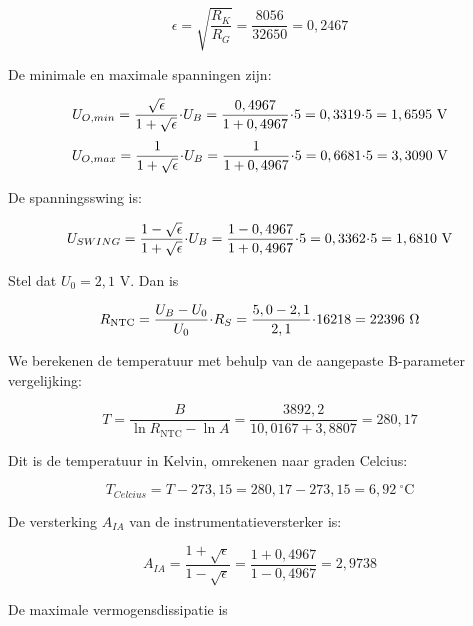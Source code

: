 \documentclass[12pt,a4paper,final,twoside,fleqn]{article}
\newcommand{\rntc}{R_\text{NTC}}
\let\oldcdot\cdot
\renewcommand{\cdot}{\kern-.10em\oldcdot\kern-.10em}
\begin{document}
\begin{equation}
\epsilon = \sqrt{\dfrac{R_K}{R_G}} = \dfrac{8056}{32650} = 0,2467
\end{equation}

De minimale en maximale spanningen zijn:

\begin{equation}
U_{O,min} = \dfrac{\sqrt{\epsilon}}{1+\sqrt{\epsilon}}\cdot U_B
          = \dfrac{0,4967}{1+0,4967}\cdot 5 = 0,3319\cdot 5
          = 1,6595\ \text{V}
\end{equation}
\begin{equation}
U_{O,max} = \dfrac{1}{1+\sqrt{\epsilon}}\cdot U_B
          = \dfrac{1}{1+0,4967}\cdot 5 = 0,6681\cdot 5
          = 3,3090\ \text{V}
\end{equation}

De spanningsswing is:

\begin{equation}
U_{SWING} = \dfrac{1-\sqrt{\epsilon}}{1+\sqrt{\epsilon}}\cdot U_B
          = \dfrac{1-0,4967}{1+0,4967}\cdot 5 = 0,3362\cdot 5
          = 1,6810\ \text{V}
\end{equation}

Stel dat $U_0 = 2,1$ V. Dan is

\begin{equation}
\rntc = \dfrac{U_B-U_0}{U_0}\cdot R_S = \dfrac{5,0-2,1}{2,1}\cdot 16218 = 22396\ \Omega
\end{equation}

We berekenen de temperatuur met behulp van de aangepaste B-parameter vergelijking:

\begin{equation}
T = \dfrac{B}{\ln \rntc - \ln A} = \dfrac{3892,2}{10,0167+3,8807} = 280,17
\end{equation}

Dit is de temperatuur in Kelvin, omrekenen naar graden Celcius:

\begin{equation}
T_{Celcius} = T - 273,15 = 280,17 - 273,15 = 6,92\ ^\circ\text{C}
\end{equation}

De versterking $A_{IA}$ van de instrumentatieversterker is:

\begin{equation}
A_{IA} = \dfrac{1+\sqrt{\epsilon}}{1-\sqrt{\epsilon}} = 
         \dfrac{1+0,4967}{1-0,4967} = 2,9738
\end{equation}

De maximale vermogensdissipatie is
\end{document}
